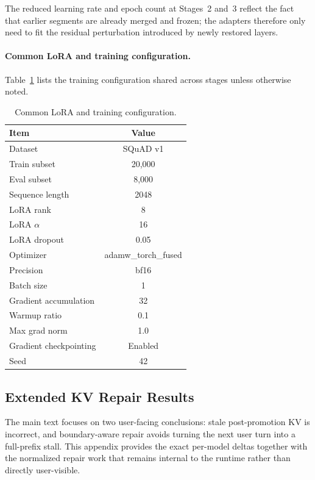 \documentclass[sigplan,anonymous,review,nonacm]{acmart}
\begin{document}
The reduced learning rate and epoch count at Stages~2 and~3 reflect
the fact that earlier segments are already merged and frozen; the
adapters therefore only need to fit the residual perturbation
introduced by newly restored layers.

\paragraph{Common LoRA and training configuration.}
Table~\ref{tab:lora_config} lists the training configuration shared
across stages unless otherwise noted.

\begin{table}[t]
\centering
\caption{Common LoRA and training configuration.}
\label{tab:lora_config}
\begin{tabular}{lc}
\toprule
Item & Value \\
\midrule
Dataset & SQuAD v1 \\
Train subset & 20,000 \\
Eval subset & 8,000 \\
Sequence length & 2048 \\
LoRA rank & 8 \\
LoRA $\alpha$ & 16 \\
LoRA dropout & 0.05 \\
Optimizer & adamw\_torch\_fused \\
Precision & bf16 \\
Batch size & 1 \\
Gradient accumulation & 32 \\
Warmup ratio & 0.1 \\
Max grad norm & 1.0 \\
Gradient checkpointing & Enabled \\
Seed & 42 \\
\bottomrule
\end{tabular}
\end{table}



\subsection{Extended KV Repair Results}
\label{app:kv-repair-details}

The main text focuses on two user-facing conclusions: stale post-promotion KV is incorrect, and boundary-aware repair avoids turning the next user turn into a full-prefix stall. This appendix provides the exact per-model deltas together with the normalized repair work that remains internal to the runtime rather than directly user-visible.
\end{document}
